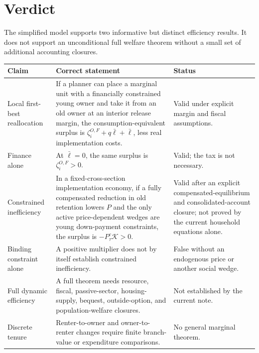 \documentclass[11pt]{article}
\newcommand{\1}{\mathbf 1}
\newcommand{\ellbar}{\bar\ell}
\begin{document}
\clearpage
\setcounter{tocdepth}{1}
\begingroup
\setlength{\parskip}{0pt}
\tableofcontents
\endgroup
\clearpage

\section{Verdict}

The simplified model supports two informative but distinct efficiency
results. It does not support an unconditional full welfare theorem without a
small set of additional accounting closures.

\begin{center}
\renewcommand{\arraystretch}{1.18}
\begin{tabularx}{\textwidth}{@{}L{0.22\textwidth}Y L{0.18\textwidth}@{}}
\toprule
Claim & Correct statement & Status \\
\midrule
Local first-best reallocation
& If a planner can place a marginal unit with a financially constrained young
owner and take it from an old owner at an interior release margin, the
consumption-equivalent surplus is
$\zeta_i^{O,F}+q\ellbar+\ellbar$, less real implementation costs.
& Valid under explicit margin and fiscal assumptions. \\
Finance alone
& At $\ellbar=0$, the same surplus is $\zeta_i^{O,F}>0$.
& Valid; the tax is not necessary. \\
Constrained inefficiency
& In a fixed-cross-section implementation economy, if a fully compensated
reduction in old retention lowers $P$ and the only active price-dependent
wedges are young down-payment constraints, the surplus is
$-P_\tau^c\mathcal K>0$.
& Valid after an explicit compensated-equilibrium and consolidated-account
closure; not proved by the current household equations alone. \\
Binding constraint alone
& A positive multiplier does not by itself establish constrained
inefficiency.
& False without an endogenous price or another social wedge. \\
Full dynamic efficiency
& A full theorem needs resource, fiscal, passive-sector, housing-supply,
bequest, outside-option, and population-welfare closures.
& Not established by the current note. \\
Discrete tenure
& Renter-to-owner and owner-to-renter changes require finite branch-value or
expenditure comparisons.
& No general marginal theorem. \\
\bottomrule
\end{tabularx}
\end{center}
\end{document}
